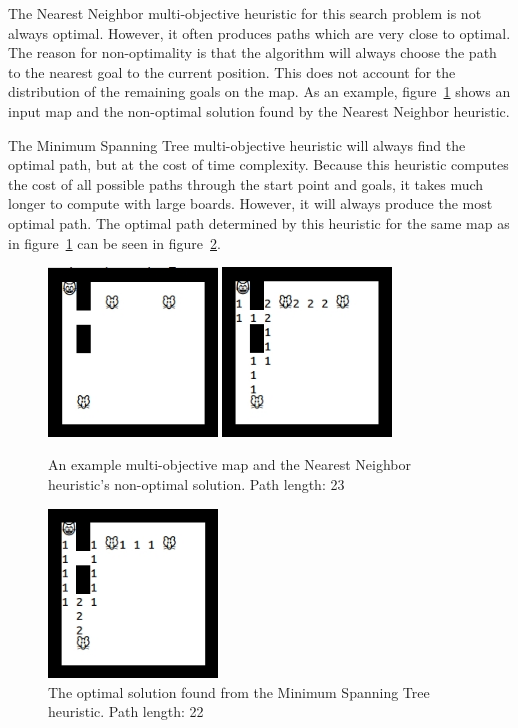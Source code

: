 \documentclass[12pt, conference, compsocconf]{IEEEtran}
\begin{document}
The Nearest Neighbor multi-objective heuristic for this search problem is not
always optimal.  However, it often produces paths which are very close to
optimal.  The reason for non-optimality is that the algorithm will always
choose the path to the nearest goal to the current position.  This does not
account for the distribution of the remaining goals on the map.  As an example,
figure~\ref{nonopt} shows an input map and the non-optimal solution found by
the Nearest Neighbor heuristic.

The Minimum Spanning Tree multi-objective heuristic will always find the
optimal path, but at the cost of time complexity.  Because this heuristic
computes the cost of all possible paths through the start point and goals, it
takes much longer to compute with large boards.  However, it will always
produce the most optimal path.  The optimal path determined by this heuristic
for the same map as in figure~\ref{nonopt} can be seen in figure~\ref{opt}.

\begin{figure}[t]
    \centering
    \includegraphics[width=0.4\textwidth]{map_mo.jpg}
    \includegraphics[width=0.4\textwidth]{map_mo_nonopt.jpg}
    \caption{An example multi-objective map and the Nearest Neighbor
heuristic's non-optimal solution.  Path length: 23}
    \label{nonopt}
\end{figure}
\begin{figure}[t]
    \centering
    \includegraphics[width=0.4\textwidth]{map_mo_opt.jpg}
    \caption{The optimal solution found from the Minimum Spanning Tree
heuristic.  Path length: 22}
    \label{opt}
\end{figure}
\end{document}
